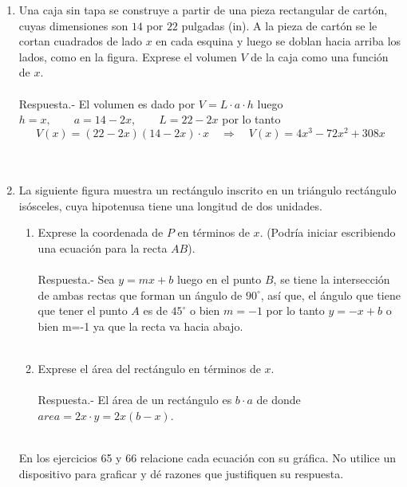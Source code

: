 \begin{enumerate}
    \item Una caja sin tapa se construye a partir de una pieza rectangular de cartón, cuyas dimensiones son $14$ por $22$ pulgadas (in). A la pieza de cartón se le cortan cuadrados de lado $x$ en cada esquina y luego se doblan hacia arriba los lados, como en la figura. Exprese el volumen $V$ de la caja como una función de $x$.\\\\
	Respuesta.-\; El volumen es dado por $V=L\cdot a\cdot h$ luego $h=x,\qquad a=14-2x, \qquad L=22-2x$ por lo tanto $$V(x)=(22-2x)(14-2x)\cdot x \quad \Longrightarrow \quad V(x)=4x^3 - 72x^2 + 308x$$\\\\

    \item La siguiente figura muestra un rectángulo inscrito en un triángulo rectángulo isósceles, cuya hipotenusa tiene una longitud de dos unidades.
    \begin{enumerate}[\bfseries a.]
	
	\item Exprese la coordenada de $P$ en términos de $x$. (Podría iniciar escribiendo una ecuación para la recta $AB$).\\\\
	    Respuesta.-\; Sea $y=mx+b$ luego en el punto $B$, se tiene la intersección de ambas rectas que forman un ángulo de $90^{\circ}$, así que, el ángulo que tiene que tener el punto $A$ es de $45^{\circ}$ o bien $m=-1$ por lo tanto $y=-x+b$ o bien m=-1 ya que la recta va hacia abajo.\\\\

	\item Exprese el área del rectángulo en términos de $x$.\\\\
	    Respuesta.-\; El área de un rectángulo es $b\cdot a$ de donde $area = 2x \cdot y = 2x(b-x)$.\\\\

    \end{enumerate}

    En los ejercicios 65 y 66 relacione cada ecuación con su gráfica. No utilice un dispositivo para graficar y dé razones que justifiquen su respuesta.\\\\


\end{enumerate}
